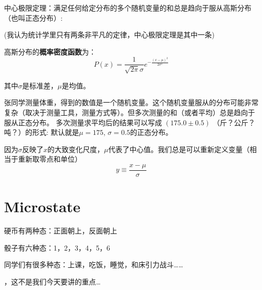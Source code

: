 \documentclass[CJK]{beamer}
\begin{document}
\begin{frame}
\bch
    {\blue 中心极限定理：满足任何给定分布的多个随机变量的和总是趋向于服从高斯分布（也叫正态分布）:}

    (我认为统计学里只有两条非平凡的定律，中心极限定理是其中一条)

    \skiplines
    
   高斯分布的{\bf 概率密度函数}为：
   $$ P(x) = \frac{1}{\sqrt{2\pi}\sigma} e^{-\frac{(x-\mu)^2}{2\sigma^2}}  $$

   其中$\sigma$是标准差，$\mu$是均值。


\ech
\end{frame}

\begin{frame}
\bch
\bex
张同学测量体重，得到的数值是一个随机变量。这个随机变量服从的分布可能非常复杂（取决于测量工具，测量方式等）。但多次测量的和（或者平均）总是趋向于服从正态分布。
多次测量求平均后的结果可以写成 $(175.0\pm0.5)$ （斤？公斤？吨？）的形式: 默认就是$\mu = 175$, $\sigma = 0.5$的正态分布。
\eex
\ech
\end{frame}


\begin{frame}
\bch
因为$\sigma$反映了$x$的大致变化尺度，$\mu$代表了中心值。我们总是可以重新定义变量（相当于重新取零点和单位）
$$y \equiv \frac{x-\mu}{\sigma}$$
\ech
\end{frame}


\section{Microstate}

\begin{frame}
\bch
\bitem
\item{硬币有两种态：正面朝上，反面朝上

}
\item{骰子有六种态：1，2，3，4，5，6

}
\item{同学们有很多种态：上课，吃饭，睡觉，和床引力战斗……

}

\eitem
\ech
\end{frame}

\begin{frame}
\bch


\skipline

，这不是我们今天要讲的重点…
\ech
\end{frame}
\end{document}
